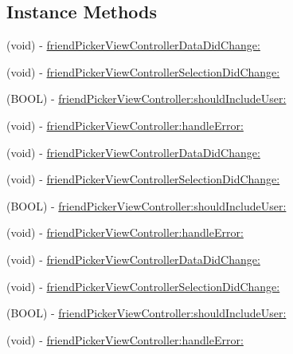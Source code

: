\subsection*{Instance Methods}
\begin{DoxyCompactItemize}
\item 
(void) -\/ \hyperlink{protocolFBFriendPickerDelegate_01-p_adb573d4fc9792d3dc05298f13bc41086}{friend\+Picker\+View\+Controller\+Data\+Did\+Change\+:}
\item 
(void) -\/ \hyperlink{protocolFBFriendPickerDelegate_01-p_a6b00500fbc7158e7b0b0155b44cd02f5}{friend\+Picker\+View\+Controller\+Selection\+Did\+Change\+:}
\item 
(B\+O\+OL) -\/ \hyperlink{protocolFBFriendPickerDelegate_01-p_a7c521c53cb2cace336ac14fb4d111f89}{friend\+Picker\+View\+Controller\+:should\+Include\+User\+:}
\item 
(void) -\/ \hyperlink{protocolFBFriendPickerDelegate_01-p_ac4b023444722c5b44144284f593c8f67}{friend\+Picker\+View\+Controller\+:handle\+Error\+:}
\item 
(void) -\/ \hyperlink{protocolFBFriendPickerDelegate_01-p_adb573d4fc9792d3dc05298f13bc41086}{friend\+Picker\+View\+Controller\+Data\+Did\+Change\+:}
\item 
(void) -\/ \hyperlink{protocolFBFriendPickerDelegate_01-p_a6b00500fbc7158e7b0b0155b44cd02f5}{friend\+Picker\+View\+Controller\+Selection\+Did\+Change\+:}
\item 
(B\+O\+OL) -\/ \hyperlink{protocolFBFriendPickerDelegate_01-p_a7c521c53cb2cace336ac14fb4d111f89}{friend\+Picker\+View\+Controller\+:should\+Include\+User\+:}
\item 
(void) -\/ \hyperlink{protocolFBFriendPickerDelegate_01-p_ac4b023444722c5b44144284f593c8f67}{friend\+Picker\+View\+Controller\+:handle\+Error\+:}
\item 
(void) -\/ \hyperlink{protocolFBFriendPickerDelegate_01-p_adb573d4fc9792d3dc05298f13bc41086}{friend\+Picker\+View\+Controller\+Data\+Did\+Change\+:}
\item 
(void) -\/ \hyperlink{protocolFBFriendPickerDelegate_01-p_a6b00500fbc7158e7b0b0155b44cd02f5}{friend\+Picker\+View\+Controller\+Selection\+Did\+Change\+:}
\item 
(B\+O\+OL) -\/ \hyperlink{protocolFBFriendPickerDelegate_01-p_a7c521c53cb2cace336ac14fb4d111f89}{friend\+Picker\+View\+Controller\+:should\+Include\+User\+:}
\item 
(void) -\/ \hyperlink{protocolFBFriendPickerDelegate_01-p_ac4b023444722c5b44144284f593c8f67}{friend\+Picker\+View\+Controller\+:handle\+Error\+:}

\end{DoxyCompactItemize}
